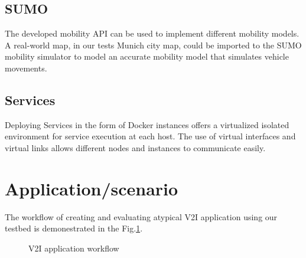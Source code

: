\documentclass[conference]{IEEEtran}
\begin{document}
\subsection{SUMO}
\par The developed mobility API can be used to implement different mobility models. A real-world map, in our tests Munich city map, could be imported to the SUMO mobility simulator to model an accurate mobility model that simulates vehicle movements. 
\subsection{Services}
\par Deploying Services in the form of Docker instances offers a virtualized isolated environment for service execution at each host. The use of virtual interfaces and virtual links allows different nodes and instances to communicate easily.

\section{Application/scenario}\label{AA}
\par The workflow of creating and evaluating atypical V2I application using our testbed is demonestrated in the Fig.\ref{fig:workflow}.

\begin{figure}
\caption{V2I application workflow}
\label{fig:workflow}
\end{figure}
\end{document}
